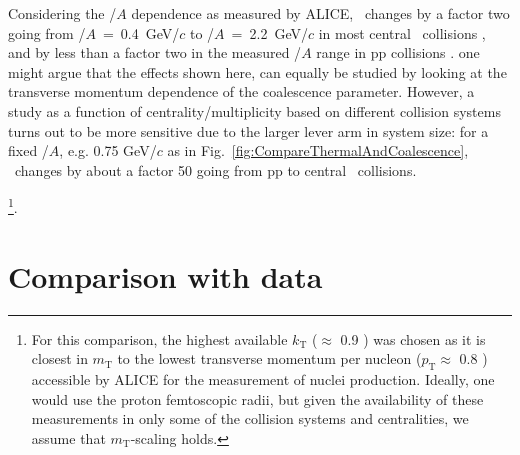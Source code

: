 \documentclass[%
 reprint,
 amsmath,amssymb,
 aps,
]{revtex4-1}
\begin{document}
Considering the \pt/$A$ dependence as measured by ALICE, \btwo~changes by a factor two going from \pt/$A$~=~0.4~GeV/$c$ to \pt/$A$~=~2.2~GeV/$c$  in most central \PbPb~collisions \cite{ALICE:deuteronppPbPb2015}, and by less than a factor two in the measured \pt/$A$ range in pp collisions \cite{ALICE:nucleipp2017, Acharya:2019rgc}.
one might argue that the effects shown here, can equally be studied by looking at the transverse momentum dependence of the coalescence parameter. However, a study as a function of centrality/multiplicity based on different collision systems turns out to be more sensitive due to the larger lever arm in system size: for a fixed \pt/$A$, e.g. 0.75 GeV/$c$ as in Fig.~\ref{fig:CompareThermalAndCoalescence}, \btwo~changes by about a factor 50 going from pp to central \PbPb~collisions. 

\footnote{For this comparison, the highest available $k_{\mathrm{T}}$ ($\approx$ 0.9 \GeVc) was chosen as it is closest in $m_{\mathrm{T}}$ to the lowest transverse momentum per nucleon ($p_{\mathrm{T}} \approx$ 0.8 \GeVc) accessible by ALICE for the measurement of nuclei production. 
Ideally, one would use the proton femtoscopic radii, but given the availability of these measurements in only some of the collision systems and centralities, 
we assume that $m_{\mathrm{T}}$-scaling holds.}.



\section{Comparison with data}
\end{document}
